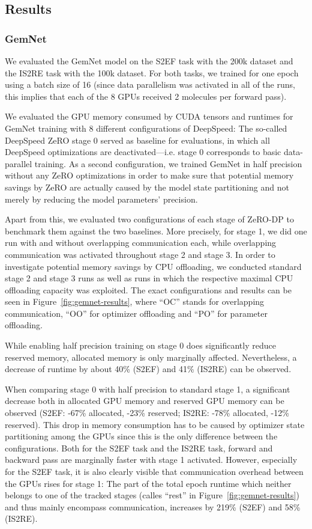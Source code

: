\subsection{Results}

\subsubsection{GemNet}

We evaluated the GemNet model on the S2EF task with the 200k dataset and
the IS2RE task with the 100k dataset. For both tasks, we trained for one epoch
using a batch size of 16 (since data parallelism was activated in all of the 
runs, this implies that each of the 8 GPUs received 2 molecules per forward pass). 

We evaluated the GPU memory consumed by CUDA tensors and runtimes for GemNet training with 8 different 
configurations of DeepSpeed:
The so-called DeepSpeed ZeRO stage 0 served as baseline for evaluations, in which 
all DeepSpeed optimizations are deactivated---i.e. stage 0 corresponds to basic 
data-parallel training. As a second configuration, we trained GemNet 
in half precision without any ZeRO optimizations in order to make sure that
potential memory savings by ZeRO are actually caused by the model state partitioning and
not merely by reducing the model parameters' precision.

Apart from this, we evaluated two configurations of each stage of ZeRO-DP to benchmark 
them against the two baselines. More precisely, for stage 1, we did one run with and 
without overlapping communication each, while overlapping communication
was activated throughout stage 2 and stage 3. In order to investigate potential 
memory savings by CPU offloading, we conducted standard stage 2 and stage 3 runs as well
as runs in which the respective maximal CPU offloading capacity was exploited.
The exact configurations and results can be seen in Figure~\ref{fig:gemnet-results}, 
where \enquote{OC} stands for overlapping communication,
\enquote{OO} for optimizer offloading and \enquote{PO} for parameter offloading.

While enabling half precision training on stage 0 does significantly reduce 
reserved memory, allocated memory is only marginally affected. Nevertheless, 
a decrease of runtime by about 40\% (S2EF) and 41\% (IS2RE) can be observed.

When comparing stage 0 with half precision to standard stage 1, a significant decrease
both in allocated GPU memory and reserved GPU memory can be observed
(S2EF: -67\% allocated, -23\% reserved; IS2RE: -78\% allocated, -12\% reserved).
This drop in memory consumption has to be caused by optimizer state partitioning among
the GPUs since this is the only difference between the configurations. 
Both for the S2EF task and the IS2RE task, forward and backward pass 
are marginally faster with stage 1 activated. 
However, especially for the S2EF task, it is also clearly visible that communication overhead 
between the GPUs rises for stage 1: The part of the total epoch runtime which
neither belongs to one of the tracked stages (calles \enquote{rest} in 
Figure~\ref{fig:gemnet-results}) and thus mainly 
encompass communication, increases by 219\% (S2EF) and 58\% (IS2RE).

